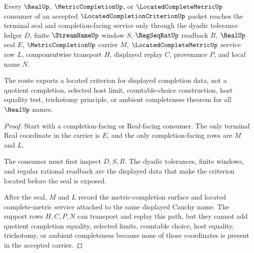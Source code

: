 \begin{theorem}
\label{thm:located-completion-criterion-real-seal-route}
Every $\RealUp$, $\MetricCompletionUp$, or $\LocatedCompleteMetricUp$ consumer of an accepted $\LocatedCompletionCriterionUp$ packet reaches the terminal seal and completion-facing service only through the dyadic tolerance ledger $D$, finite $\StreamNameUp$ window $S$, $\RegSeqRatUp$ readback $R$, $\RealUp$ seal $E$, $\MetricCompletionUp$ carrier $M$, $\LocatedCompleteMetricUp$ service row $L$, componentwise transport $H$, displayed replay $C$, provenance $P$, and local name $N$.

The route exports a located criterion for displayed completion data, not a quotient completion, selected host limit, countable-choice construction, host equality test, trichotomy principle, or ambient completeness theorem for all $\RealUp$ names.
\end{theorem}
\begin{proof}
Start with a completion-facing or Real-facing consumer. The only terminal Real coordinate in the carrier is $E$, and the only completion-facing rows are $M$ and $L$.

The consumer must first inspect $D,S,R$. The dyadic tolerances, finite windows, and regular rational readback are the displayed data that make the criterion located before the seal is exposed.

After the seal, $M$ and $L$ record the metric-completion surface and located complete-metric service attached to the same displayed Cauchy name. The support rows $H,C,P,N$ can transport and replay this path, but they cannot add quotient completion equality, selected limits, countable choice, host equality, trichotomy, or ambient completeness because none of those coordinates is present in the accepted carrier.
\end{proof}


